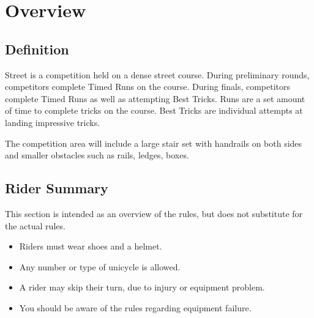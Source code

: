 \chapter{Overview}

\section{Definition}

Street is a competition held on a dense street course.
During preliminary rounds, competitors complete Timed Runs on the course.
During finals, competitors complete Timed Runs as well as attempting Best Tricks.
Runs are a set amount of time to complete tricks on the course.
Best Tricks are individual attempts at landing impressive tricks.

The competition area will include a large stair set with handrails on both sides and smaller obstacles such as rails, ledges, boxes.

\section{Rider Summary}

This section is intended as an overview of the rules, but does not substitute for the actual rules.
\begin{itemize}
\item Riders must wear shoes and a helmet.
\item Any number or type of unicycle is allowed.
\item A rider may skip their turn, due to injury or equipment problem.
\item You should be aware of the rules regarding equipment failure.
\end{itemize}
